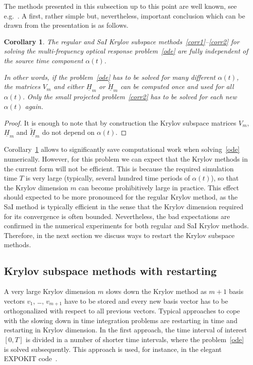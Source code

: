 \documentclass[11pt]{elsarticle}
\newcommand{\Hh}{\underline{H}}
\newcommand{\Hht}{\underline{\tilde{H}}}
\newtheorem{coroll}{Corollary}
\begin{document}
The methods presented in this subsection up to this point are 
well known, see 
e.g.~\cite{CelledoniMoret97,DruskinGreenbaumKnizhnerman98,BGH13}.  
A first, rather simple but, nevertheless,
important conclusion which can be drawn from the presentation is 
as follows.

\begin{coroll}
\label{res:no_rst}
The regular and SaI Krylov subspace methods~\eqref{corr1}--\eqref{corr2}
for solving the multi-frequency optical response problem~\eqref{ode}
are fully independent of the source time component $\alpha(t)$.  

In other words, if the problem~\eqref{ode} has to be solved for
many different $\alpha(t)$, the matrices $V_m$ and either 
$\Hh_m$ or $\Hht_m$ can be computed once and used for all
$\alpha(t)$.  Only the small projected problem~\eqref{corr2}
has to be solved for each new $\alpha(t)$ again.
\end{coroll} 

\begin{proof}
It is enough to note that by construction the Krylov subspace matrices 
$V_m$, $\Hh_m$ and $\Hht_m$ do not depend on $\alpha(t)$.
\end{proof}

Corollary~\ref{res:no_rst} allows to significantly save 
computational work when solving~\eqref{ode} numerically.
However, for this problem we can expect that the Krylov 
methods in the current form will not be efficient.  This is
because the required simulation time $T$ is very large (typically,
several hundred time periods of $\alpha(t)$), so that the Krylov
dimension $m$ can become prohibitively large in practice.
This effect should expected to be more pronounced for the regular
Krylov method, as the SaI method is typically efficient
in the sense that the Krylov dimension required for its convergence
is often bounded.
Nevertheless, the bad expectations are confirmed 
in the numerical experiments for both regular and SaI Krylov methods.  
Therefore, in the next section we discuss ways to restart
the Krylov subspace methods.

\subsection{Krylov subspace methods with restarting}
\label{sect:Kr2}
A very large Krylov dimension $m$ slows down the Krylov method as
$m+1$ basis vectors $v_1$, \dots, $v_{m+1}$ have to
be stored and every new basis vector has to be orthogonalized
with respect to all previous vectors.
Typical approaches to cope with the slowing down in time integration problems
are restarting in time and restarting in
Krylov dimension.  In the first approach, 
the time interval of interest $[0,T]$ is divided 
in a number of shorter time intervals, where the problem~\eqref{ode}
is solved subsequently.  This approach is used, for instance,
in the elegant EXPOKIT code~\cite{EXPOKIT}.
\end{document}
